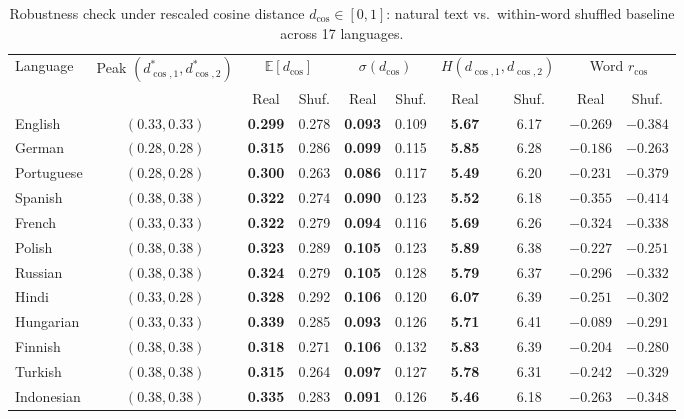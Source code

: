 \documentclass[11pt,a4paper,leqno]{article}
\begin{document}
\begin{table}[htbp]
\caption{Robustness check under rescaled cosine distance $d_{\cos} \in [0,1]$: natural text vs.\ within-word shuffled baseline across 17 languages.}
\centering\footnotesize
\begin{tabular}{lccccccccc}
\toprule
Language & Peak $(d_{\cos,1}^*, d_{\cos,2}^*)$ & \multicolumn{2}{c}{$\mathbb{E}[d_{\cos}]$} & \multicolumn{2}{c}{$\sigma(d_{\cos})$} & \multicolumn{2}{c}{$H(d_{\cos,1}, d_{\cos,2})$} & \multicolumn{2}{c}{Word $r_{\cos}$} \\
\cmidrule(lr){3-4} \cmidrule(lr){5-6} \cmidrule(lr){7-8} \cmidrule(lr){9-10}
 & & Real & Shuf. & Real & Shuf. & Real & Shuf. & Real & Shuf. \\
\midrule
English    & $(0.33, 0.33)$ & \textbf{0.299} & 0.278 & \textbf{0.093} & 0.109 & \textbf{5.67} & 6.17 & $-0.269$ & $-0.384$ \\
German     & $(0.28, 0.28)$ & \textbf{0.315} & 0.286 & \textbf{0.099} & 0.115 & \textbf{5.85} & 6.28 & $-0.186$ & $-0.263$ \\
Portuguese & $(0.28, 0.28)$ & \textbf{0.300} & 0.263 & \textbf{0.086} & 0.117 & \textbf{5.49} & 6.20 & $-0.231$ & $-0.379$ \\
Spanish    & $(0.38, 0.38)$ & \textbf{0.322} & 0.274 & \textbf{0.090} & 0.123 & \textbf{5.52} & 6.18 & $-0.355$ & $-0.414$ \\
French     & $(0.33, 0.33)$ & \textbf{0.322} & 0.279 & \textbf{0.094} & 0.116 & \textbf{5.69} & 6.26 & $-0.324$ & $-0.338$ \\
Polish     & $(0.38, 0.38)$ & \textbf{0.323} & 0.289 & \textbf{0.105} & 0.123 & \textbf{5.89} & 6.38 & $-0.227$ & $-0.251$ \\
Russian    & $(0.38, 0.38)$ & \textbf{0.324} & 0.279 & \textbf{0.105} & 0.128 & \textbf{5.79} & 6.37 & $-0.296$ & $-0.332$ \\
Hindi      & $(0.33, 0.28)$ & \textbf{0.328} & 0.292 & \textbf{0.106} & 0.120 & \textbf{6.07} & 6.39 & $-0.251$ & $-0.302$ \\
Hungarian  & $(0.33, 0.33)$ & \textbf{0.339} & 0.285 & \textbf{0.093} & 0.126 & \textbf{5.71} & 6.41 & $-0.089$ & $-0.291$ \\
Finnish    & $(0.38, 0.38)$ & \textbf{0.318} & 0.271 & \textbf{0.106} & 0.132 & \textbf{5.83} & 6.39 & $-0.204$ & $-0.280$ \\
Turkish    & $(0.38, 0.38)$ & \textbf{0.315} & 0.264 & \textbf{0.097} & 0.127 & \textbf{5.78} & 6.31 & $-0.242$ & $-0.329$ \\
Indonesian & $(0.38, 0.38)$ & \textbf{0.335} & 0.283 & \textbf{0.091} & 0.126 & \textbf{5.46} & 6.18 & $-0.263$ & $-0.348$ \\

\end{tabular}
\end{table}
\end{document}
